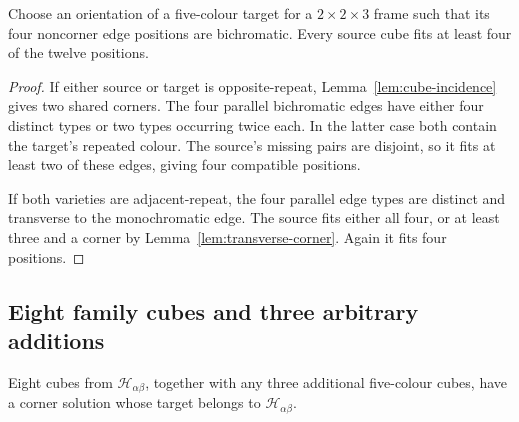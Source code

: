 \begin{lemma}\label{lem:thin-compatibility}
Choose an orientation of a five-colour target for a $2\times2\times3$
frame such that its four noncorner edge positions are bichromatic.
Every source cube fits at least four of the twelve positions.
\end{lemma}

\begin{proof}
If either source or target is opposite-repeat,
Lemma~\ref{lem:cube-incidence} gives two shared corners.
The four parallel bichromatic edges have either four distinct types or
two types occurring twice each. In the latter case both contain the
target's repeated colour. The source's missing pairs are disjoint, so
it fits at least two of these edges, giving four compatible positions.

If both varieties are adjacent-repeat, the four parallel edge types are
distinct and transverse to the monochromatic edge. The source fits either
all four, or at least three and a corner by
Lemma~\ref{lem:transverse-corner}. Again it fits four positions.
\end{proof}

\subsection{Eight family cubes and three arbitrary additions}


\begin{lemma}\label{lem:eight-common-missing}
Eight cubes from $\mathcal H_{\alpha\beta}$, together with any three additional
five-colour cubes, have a corner solution whose target belongs to
$\mathcal H_{\alpha\beta}$.
\end{lemma}

